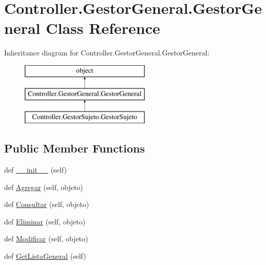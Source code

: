 \hypertarget{class_controller_1_1_gestor_general_1_1_gestor_general}{}\section{Controller.\+Gestor\+General.\+Gestor\+General Class Reference}
\label{class_controller_1_1_gestor_general_1_1_gestor_general}
Inheritance diagram for Controller.\+Gestor\+General.\+Gestor\+General\+:\begin{figure}[H]
\begin{center}
\leavevmode
\includegraphics[height=3.000000cm]{class_controller_1_1_gestor_general_1_1_gestor_general}
\end{center}
\end{figure}
\subsection*{Public Member Functions}
\begin{DoxyCompactItemize}
\item 
def \hyperlink{class_controller_1_1_gestor_general_1_1_gestor_general_ae863157e839c4210ed21da4d237e69ca}{\+\_\+\+\_\+init\+\_\+\+\_\+} (self)
\item 
def \hyperlink{class_controller_1_1_gestor_general_1_1_gestor_general_a9b620b3b9747d3f976c499d623bb975b}{Agregar} (self, objeto)
\item 
def \hyperlink{class_controller_1_1_gestor_general_1_1_gestor_general_a4a1ebb934efd98e4d1ffd065144c0427}{Consultar} (self, objeto)
\item 
def \hyperlink{class_controller_1_1_gestor_general_1_1_gestor_general_a15a6db0b2a80304807dbfb1b0ea5a8e7}{Eliminar} (self, objeto)
\item 
def \hyperlink{class_controller_1_1_gestor_general_1_1_gestor_general_a61090b6b006fcc791c2fe55f251405e4}{Modificar} (self, objeto)
\item 
def \hyperlink{class_controller_1_1_gestor_general_1_1_gestor_general_af0302d39caf2be664abae8a96594c416}{Get\+Lista\+General} (self)
\end{DoxyCompactItemize}
